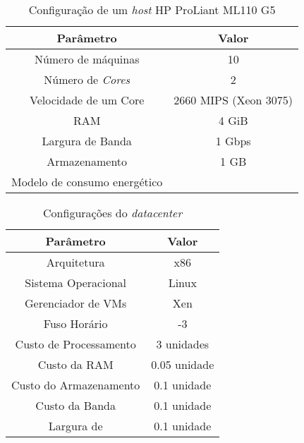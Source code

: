 \begin{table}
	\centering
    \begin{tabular}{|c|c|}
    \hline
    \textbf{Parâmetro}            & \textbf{Valor}     \\ \hline
    Número de máquinas            & 10                            \\
    Número de \emph{Cores}        & 2                             \\
    Velocidade de um Core         & 2660 MIPS (Xeon 3075)         \\
    RAM                           & 4 GiB                         \\
    Largura de Banda              & 1 Gbps                        \\
    Armazenamento                 & 1 GB                          \\
    Modelo de consumo energético  & \cite{spec:proliant_ml110_g5} \\ \hline
    \end{tabular}
    \caption {Configuração de um \emph{host} HP ProLiant ML110 G5}
    \label{tab:configuracao_hp_g5}
\end{table}



\begin{table}
	\centering
    \begin{tabular}{|c|c|}
    \hline
    \textbf{Parâmetro}     & \textbf{Valor}     \\ \hline
    Arquitetura            & x86          \\
    Sistema Operacional    & Linux        \\
    Gerenciador de VMs     & Xen          \\
    Fuso Horário           & -3           \\
    Custo de Processamento & 3 unidades   \\
    Custo da RAM           & 0.05 unidade \\
    Custo do Armazenamento & 0.1 unidade  \\
    Custo da Banda         & 0.1 unidade  \\ \hline
    Largura de          & 0.1 unidade  \\ \hline
    \end{tabular}
    \caption {Configurações do \emph{datacenter}}
    \label{tab:configuracao_datacenter}
\end{table}




